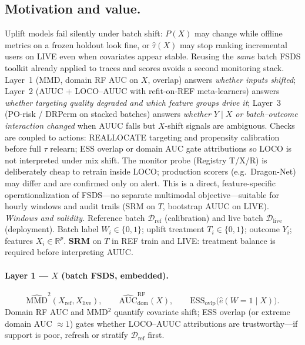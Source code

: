 \documentclass{article}
\begin{document}
\subsection{Motivation and value.}
Uplift models fail silently under batch shift: $P(X)$ may change while offline metrics on a frozen holdout look fine, or $\hat\tau(X)$ may stop ranking incremental users on LIVE even when covariates appear stable.
Reusing the \emph{same} batch FSDS toolkit already applied to traces and scores avoids a second monitoring stack.
Layer~1 (MMD, domain RF AUC on $X$, overlap) answers \emph{whether inputs shifted}; Layer~2 (AUUC + LOCO--AUUC with refit-on-REF meta-learners) answers \emph{whether targeting quality degraded and which feature groups drive it}; Layer~3 (PO-risk / DRPerm on stacked batches) answers \emph{whether $Y\mid X$ or batch--outcome interaction changed} when AUUC falls but $X$-shift signals are ambiguous.
Checks are coupled to actions: REALLOCATE targeting and propensity calibration before full $\tau$ relearn; ESS overlap or domain AUC gate attributions so LOCO is not interpreted under mix shift.
The monitor probe (Registry T/X/R) is deliberately cheap to retrain inside LOCO; production scorers (e.g.\ Dragon-Net) may differ and are confirmed only on alert.
This is a direct, feature-specific operationalization of FSDS---no separate multimodal objective---suitable for hourly windows and audit trails (SRM on $T$, bootstrap AUUC on LIVE).\\

\emph{Windows and validity.}
Reference batch $\mathcal{D}_{\mathrm{ref}}$ (calibration) and live batch $\mathcal{D}_{\mathrm{live}}$ (deployment).
Batch label $W_i\in\{0,1\}$; uplift treatment $T_i\in\{0,1\}$; outcome $Y_i$; features $X_i\in\mathbb{R}^p$.
\textbf{SRM} on $T$ in REF train and LIVE: treatment balance is required before interpreting AUUC.

\paragraph{Layer 1 --- $X$ (batch FSDS, embedded).}
\[
  \widehat{\mathrm{MMD}}^2(X_{\mathrm{ref}},X_{\mathrm{live}}),
  \qquad
  \widehat{\mathrm{AUC}}_{\mathrm{dom}}^{\mathrm{RF}}(X),
  \qquad
  \mathrm{ESS}_{\mathrm{ovlp}}\bigl(\hat e(W{=}1\mid X)\bigr).
\]
Domain RF AUC and MMD$^2$ quantify covariate shift; ESS overlap (or extreme domain AUC $\approx 1$) gates whether LOCO--AUUC attributions are trustworthy---if support is poor, refresh or stratify $\mathcal{D}_{\mathrm{ref}}$ first.
\end{document}
